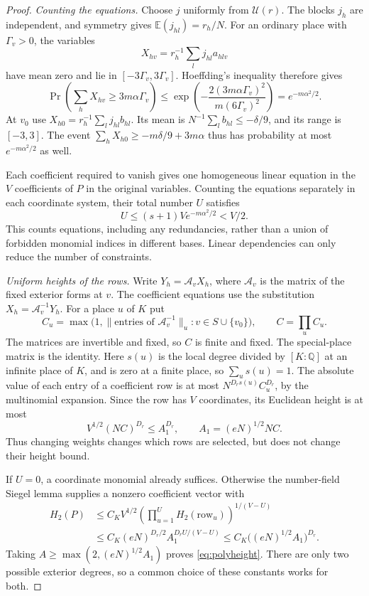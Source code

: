 \documentclass[11pt]{article}
\numberwithin{equation}{section}
\theoremstyle{remark}\newtheorem{remark}[theorem]{Remark}
\newcommand{\Q}{\mathbb Q}\newcommand{\Z}{\mathbb Z}
\begin{document}
\begin{proof}
\emph{Counting the equations.}
Choose $j$ uniformly from $\mathcal U(r)$. The blocks $j_h$ are
independent, and symmetry gives $\mathbb E(j_{hl})=r_h/N$.
For an ordinary place with $\Gamma_v>0$, the variables
\[
 X_{hv}=r_h^{-1}\sum_lj_{hl}a_{hlv}
\]
have mean zero and lie in $[-3\Gamma_v,3\Gamma_v]$.
Hoeffding's inequality \cite[Lemma~13.2]{EF13} therefore gives
\[
 \Pr\left(\sum_hX_{hv}\ge3m\alpha\Gamma_v\right)
 \le\exp\left(-\frac{2(3m\alpha\Gamma_v)^2}
                         {m(6\Gamma_v)^2}\right)
 =e^{-m\alpha^2/2}.
\]
At $v_0$ use $X_{h0}=r_h^{-1}\sum_lj_{hl}b_{hl}$.
Its mean is $N^{-1}\sum_lb_{hl}\le-\delta/9$, and its range is
$[-3,3]$. The event
$\sum_hX_{h0}\ge-m\delta/9+3m\alpha$ thus has probability at most
$e^{-m\alpha^2/2}$ as well.

Each coefficient required to vanish gives one homogeneous linear
equation in the $V$ coefficients of $P$ in the original variables.
Counting the equations separately in each coordinate system, their
total number $U$ satisfies
\begin{equation}\label{eq:equationcount}
 U\le(s+1)Ve^{-m\alpha^2/2}<V/2.
\end{equation}
This counts equations, including any redundancies, rather than a
union of forbidden monomial indices in different bases. Linear
dependencies can only reduce the number of constraints.

\emph{Uniform heights of the rows.}
Write $Y_h=\mathscr A_vX_h$, where $\mathscr A_v$ is the matrix of
the fixed exterior forms at $v$. The coefficient equations use the
substitution $X_h=\mathscr A_v^{-1}Y_h$. For a place $u$ of $K$ put
\[
 C_u=\max\bigl(1,\|\text{entries of }\mathscr A_v^{-1}\|_u:
                         v\in S\cup\{v_0\}\bigr),\qquad C=\prod_uC_u.
\]
The matrices are invertible and fixed, so $C$ is finite and fixed.
The special-place matrix is the identity. Here $s(u)$ is the local
degree divided by $[K:\Q]$ at an infinite place of $K$, and is zero
at a finite place, so $\sum_us(u)=1$. The absolute value of each
entry of a coefficient row is at most
$N^{D_rs(u)}C_u^{D_r}$, by the multinomial expansion.
Since the row has $V$ coordinates, its Euclidean
height is at most
\[
 V^{1/2}(NC)^{D_r}\le A_1^{D_r},\qquad
 A_1=(eN)^{1/2}NC.
\]
Thus changing weights changes which rows are selected, but does not
change their height bound.

If $U=0$, a coordinate monomial already suffices. Otherwise the
number-field Siegel lemma \cite[Lemma~13.1]{EF13} supplies a nonzero
coefficient vector with
\begin{align*}
 H_2(P)&\le C_KV^{1/2}
          \left(\prod_{u=1}^UH_2(\text{row}_u)\right)^{1/(V-U)}\\
 &\le C_K(eN)^{D_r/2}A_1^{D_rU/(V-U)}
 \le C_K\bigl((eN)^{1/2}A_1\bigr)^{D_r}.
\end{align*}
Taking $A\ge\max(2,(eN)^{1/2}A_1)$ proves \eqref{eq:polyheight}.
There are only two possible exterior degrees, so a common choice of
these constants works for both.
\end{proof}
\end{document}
